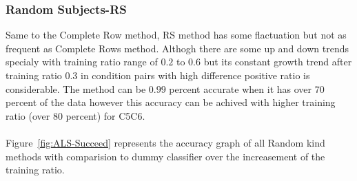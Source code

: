 \documentclass[10pt, conference, compsocconf]{IEEEtran}
\begin{document}
\subsubsection{Random Subjects-RS}
Same to the Complete Row method, RS method has some flactuation but not as frequent 
as Complete Rows method. Althogh there are some up and down trends specialy with 
training ratio range of $0.2$ to $0.6$ but its constant growth trend after 
training ratio $0.3$ in condition pairs with high difference positive ratio is considerable.
The method can be $0.99$ percent accurate when it has over 70 percent of the data however 
this accuracy can be achived with higher training ratio (over 80 percent) for C5C6.  
\\
\\
\noindent Figure~\ref{fig:ALS-Succeed} represents
the accuracy graph of all Random kind methods with comparision to dummy
classifier over the increasement of the training ratio.\\
\end{document}
